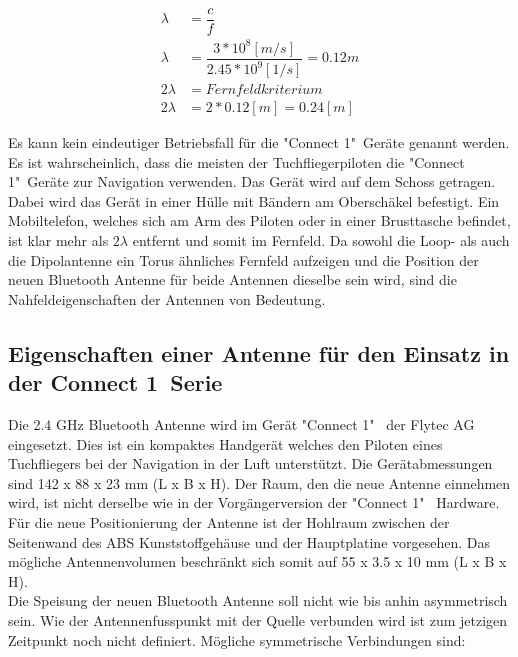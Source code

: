 \begin{eqnarray}
\lambda &=\dfrac{c}{f} \\
\lambda &=\dfrac{3*10^{8} [m/s]}{2.45*10^{9} [1/s]}=0.12m\\ 
2\lambda &= Fernfeldkriterium\\ 
2\lambda &= 2*0.12[m] =0.24 [m] \label{eq:Fernfeld}
\end{eqnarray}

Es kann kein eindeutiger Betriebsfall für die "Connect 1"\  Geräte genannt werden. Es ist wahrscheinlich, dass die meisten der Tuchfliegerpiloten die "Connect 1"\  Geräte zur Navigation verwenden. Das Gerät wird auf dem Schoss getragen. Dabei wird das Gerät in einer Hülle mit Bändern am Oberschäkel befestigt. Ein Mobiltelefon, welches sich am Arm des Piloten oder in einer Brusttasche befindet, ist klar mehr als $2\lambda$ entfernt und somit im Fernfeld. Da sowohl die Loop- als auch die Dipolantenne ein Torus ähnliches Fernfeld aufzeigen und die Position der neuen Bluetooth Antenne für beide Antennen dieselbe sein wird, sind die Nahfeldeigenschaften der Antennen von Bedeutung.

\subsection{Eigenschaften einer Antenne für den Einsatz in der \glqq Connect 1\grqq \  Serie}\label{sec:EigenschaftenAntenne}
Die 2.4 GHz Bluetooth Antenne wird im Gerät "Connect 1" \  der Flytec AG eingesetzt. Dies ist ein kompaktes Handgerät welches den Piloten eines Tuchfliegers bei der Navigation in der Luft unterstützt. Die Gerätabmessungen sind 142 x 88 x 23 mm (L x B x H). Der Raum, den die neue Antenne einnehmen wird, ist nicht derselbe wie in der Vorgängerversion der "Connect 1" \ Hardware. Für die neue Positionierung der Antenne ist der Hohlraum zwischen der Seitenwand des ABS Kunststoffgehäuse und der Hauptplatine  vorgesehen. Das mögliche Antennenvolumen beschränkt sich somit auf 55 x 3.5 x 10 mm (L x B x H).\\
Die Speisung der neuen Bluetooth Antenne soll nicht wie bis anhin asymmetrisch sein. Wie der Antennenfusspunkt mit der Quelle verbunden wird ist zum jetzigen Zeitpunkt noch nicht definiert. Mögliche symmetrische Verbindungen sind:


